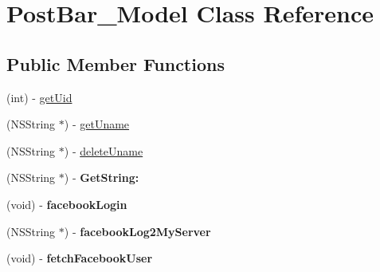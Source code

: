 \hypertarget{interface_post_bar___model}{
\section{PostBar\_\-Model Class Reference}
\label{interface_post_bar___model}
}
\subsection*{Public Member Functions}
\begin{DoxyCompactItemize}
\item 
(int) -\/ \hyperlink{interface_post_bar___model_a358a546bf3d664e78e3bd454671c2a6e}{getUid}
\item 
(NSString $\ast$) -\/ \hyperlink{interface_post_bar___model_a69dd8f8ecea777eb10bbd5961183330e}{getUname}
\item 
(NSString $\ast$) -\/ \hyperlink{interface_post_bar___model_a4f953b0d88345364209684e3245f349c}{deleteUname}
\item 
\hypertarget{interface_post_bar___model_a3e4dd572f1c11a0b33fe2c1c82998e0d}{
(NSString $\ast$) -\/ {\bfseries GetString:}}
\label{interface_post_bar___model_a3e4dd572f1c11a0b33fe2c1c82998e0d}

\item 
\hypertarget{interface_post_bar___model_a068f89fc2057ece582505b8079550472}{
(void) -\/ {\bfseries facebookLogin}}
\label{interface_post_bar___model_a068f89fc2057ece582505b8079550472}

\item 
\hypertarget{interface_post_bar___model_a48541fb75e7fbe46500b01541166e30d}{
(NSString $\ast$) -\/ {\bfseries facebookLog2MyServer}}
\label{interface_post_bar___model_a48541fb75e7fbe46500b01541166e30d}

\item 
\hypertarget{interface_post_bar___model_a5b06e2482ff2f94d441e238e1bd08d44}{
(void) -\/ {\bfseries fetchFacebookUser}}
\label{interface_post_bar___model_a5b06e2482ff2f94d441e238e1bd08d44}


\end{DoxyCompactItemize}
